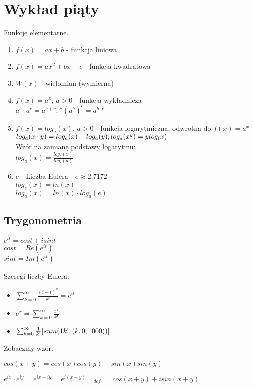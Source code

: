 \documentclass{article}
\theoremstyle{definition}
\theoremstyle{definition}
\theoremstyle{definition}
\theoremstyle{definition}
\begin{document}
\section{Wykład piąty}

Funkcje elementarne.
\begin{enumerate}
    \item $f(x)=ax+b$ - funkcja liniowa
    \item $f(x)=ax^2+bx+c$ - funkcja kwadratowa
    \item $W(x)$ - wielomian (wymierna)
    \item $f(x)=a^x$, $a>0$ - funkcja wykładnicza\\
    $a^b\cdot a^c=a^{b+c};'' (a^b)^c=a^{b\cdot c}$
    \item $f(x)=log_a(x)$, $a>0$ - funkcja logarytmiczna, odwrotna do $f(x)=a^x$\\
    $log_a(x\cdot y)=log_a(x)+log_a(y);\\ log_a(x^y)=ylog_(x)$\\
    Wzór na zamianę podstawy logarytmu:\\
    $log_a(x)=\frac{log_b(x)}{log_b(a)}$
    \item $e$ - Liczba Eulera - $e\approx 2.7172$\\
    $log_e(x)=ln(x)$\\
    $log_a(x)=ln(x)\cdot log_a(e)$
\end{enumerate}

\subsection{Trygonometria}
\begin{center}
$e^{it}=cost + isint$\\
$cost = Re(e^{it})$\\
$sint = Im(e^{it})$
\end{center}

Szeregi liczby Eulera:
\begin{itemize}
    \item $\sum_{k=0}^{\infty} \frac{(i-t)^k}{k!}=e^{it}$
    \item $e^x = \sum_{k=0}^{\infty} \frac{x^k}{k!}$
    \item $\sum_{k=0}^{\infty} \frac{1}{k!} [sum(1\/k!, (k,0,1000))]$
\end{itemize}

Zobaczmy wzór:

$cos(x+y)=cos(x)cos(y)-sin(x)sin(y)$

$e^{ix}\cdot e^{iy} = e^{ix + iy}=e^{i(x+y)}=_{def}=cos(x+y)+isin(x+y)$
\end{document}
